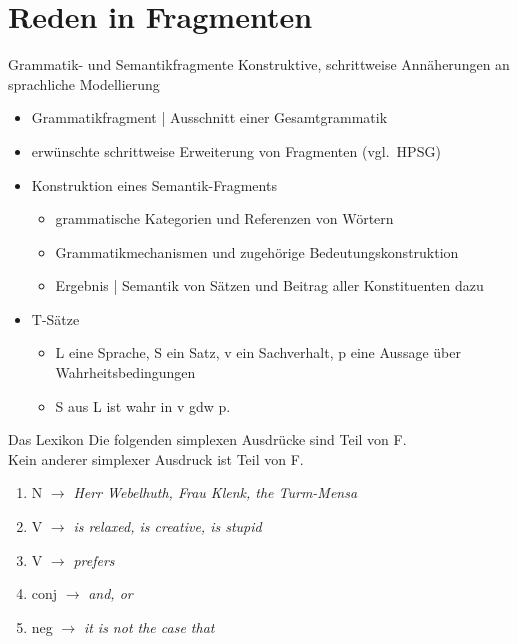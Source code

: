 \section{Reden in Fragmenten}

\begin{frame}
  {Grammatik- und Semantikfragmente}
  \onslide<+->
  \onslide<+->
  \alert{Konstruktive}, \alert{schrittweise} Annäherungen an sprachliche Modellierung\\
  \Zeile
  \begin{itemize}[<+->]
    \item Grammatikfragment | Ausschnitt einer Gesamtgrammatik
    \item erwünschte schrittweise Erweiterung von Fragmenten (vgl.\ HPSG)
      \Zeile
    \item Konstruktion eines Semantik-Fragments
      \begin{itemize}[<+->]
         \item grammatische Kategorien und Referenzen von Wörtern
         \item Grammatikmechanismen und zugehörige Bedeutungskonstruktion
         \item Ergebnis | Semantik von Sätzen und Beitrag aller Konstituenten dazu
      \end{itemize}
    \item \Halbzeile
      \alert{T-Sätze}
      \begin{itemize}[<+->]
        \item \alert{L} eine Sprache, \alert{S} ein Satz, \alert{v} ein Sachverhalt, \alert{p} eine Aussage über Wahrheitsbedingungen
        \item \alert{S aus L ist wahr in v gdw p.}
      \end{itemize}
  \end{itemize}
\end{frame}

\begin{frame}
  {Das Lexikon}
  \onslide<+->
  \onslide<+->
  Die folgenden simplexen Ausdrücke sind Teil von F.\\
  \onslide<+->
  Kein anderer simplexer Ausdruck ist Teil von F.\\
  \Halbzeile
  \begin{enumerate}[<+->]
    \item N $\rightarrow$ \emph{Herr Webelhuth, Frau Klenk, the Turm-Mensa} \label{lex01}
    \item V $\rightarrow$ \emph{is relaxed, is creative, is stupid} \label{lex02}
    \item V $\rightarrow$ \emph{prefers} \label{lex03}
    \item conj $\rightarrow$ \emph{and, or} \label{lex04}
    \item neg $\rightarrow$ \emph{it is not the case that} \label{lex05}
  \end{enumerate}
\end{frame}

